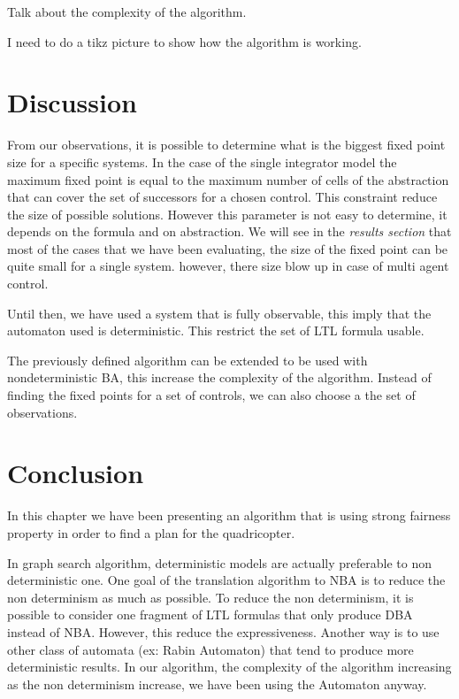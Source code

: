 Talk about the complexity of the algorithm.

I need to do a tikz picture to show how the algorithm is working.

\section{Discussion}
From our observations, it is possible to determine what is the biggest fixed point size for a specific systems.
In the case of the single integrator model the maximum fixed point is equal to the maximum number of cells of the abstraction that can cover the set of successors for a chosen control.
This constraint reduce the size of possible solutions.
However this parameter is not easy to determine, it depends on the formula and on abstraction.
We will see in the \textit{results section} that most of the cases that we have been evaluating, the size of the fixed point can be quite small for a single system. however, there size blow up in case of multi agent control.

Until then, we have used a system that is fully observable, this imply that the \buchi{} automaton used is deterministic.
This restrict the set of LTL formula usable. 

The previously defined algorithm can be extended to be used with nondeterministic BA, this increase the complexity of the algorithm. 
Instead of finding the fixed points for a set of controls, we can also choose a the set of observations.


\section{Conclusion}
In this chapter we have been presenting an algorithm that is using strong fairness property in order to find a plan for the quadricopter.



In graph search algorithm, deterministic models are actually preferable to non deterministic one. One goal of the translation algorithm to NBA is to reduce the non determinism as much as possible. 
To reduce the non determinism, it is possible to consider one fragment of LTL formulas that only produce DBA instead of NBA.
However, this reduce the expressiveness. Another way is to use other class of automata (ex: Rabin Automaton) that tend to produce more deterministic results.
In our algorithm, the complexity of the algorithm increasing as the non determinism increase, we have been using the \buchi{} Automaton anyway.